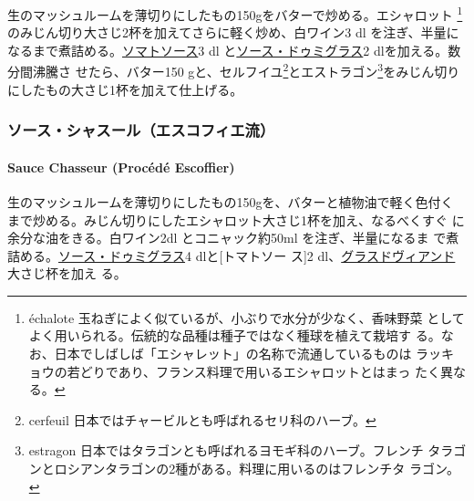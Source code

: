 \begin{recette}
  

生のマッシュルームを薄切りにしたもの150gをバターで炒める。エシャロット
\footnote{échalote
  玉ねぎによく似ているが、小ぶりで水分が少なく、香味野菜
  としてよく用いられる。伝統的な品種は種子ではなく種球を植えて栽培す
  る。なお、日本でしばしば「エシャレット」の名称で流通しているものは
  ラッキョウの若どりであり、フランス料理で用いるエシャロットとはまっ
  たく異なる。}のみじん切り大さじ2\undemi{}杯を加えてさらに軽く炒め、白ワイン3
dl
を注ぎ、半量になるまで煮詰める。\protect\hyperlink{sauce-tomate}{ソマトソース}3
dl と\protect\hyperlink{sauce-demi-glace}{ソース・ドゥミグラス}2
dlを加える。数分間沸騰さ せたら、バター150 gと、セルフイユ\footnote{cerfeuil
  日本ではチャービルとも呼ばれるセリ科のハーブ。}とエストラゴン\footnote{estragon
  日本ではタラゴンとも呼ばれるヨモギ科のハーブ。フレンチ
  タラゴンとロシアンタラゴンの2種がある。料理に用いるのはフレンチタ
  ラゴン。}をみじん切り にしたもの大さじ1\undemi{}杯を加えて仕上げる。

\maeaki

\hypertarget{ux30bdux30fcux30b9ux30b7ux30e3ux30b9ux30fcux30ebux30a8ux30b9ux30b3ux30d5ux30a3ux30a8ux6d41}{%
\subsubsection{ソース・シャスール（エスコフィエ流）}\label{ux30bdux30fcux30b9ux30b7ux30e3ux30b9ux30fcux30ebux30a8ux30b9ux30b3ux30d5ux30a3ux30a8ux6d41}}

\hypertarget{sauce-chasseur-procede-escoffier}{%
\paragraph{Sauce Chasseur (Procédé
Escoffier)}\label{sauce-chasseur-procede-escoffier}}

   

生のマッシュルームを薄切りにしたもの150gを、バターと植物油で軽く色付く
まで炒める。みじん切りにしたエシャロット大さじ1杯を加え、なるべくすぐ
に余分な油をきる。白ワイン2dl とコニャック約50ml を注ぎ、半量になるま
で煮詰める。\protect\hyperlink{sauce-demi-glace}{ソース・ドゥミグラス}4
dlと{[}トマトソー ス{]}2
dl、\protect\hyperlink{glace-de-viande}{グラスドヴィアンド}大さじ\undemi{}杯を加え
る。


\end{recette}
